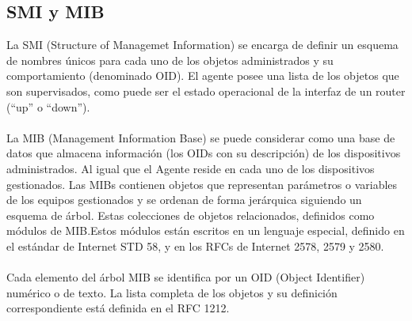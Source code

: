 \documentclass[letterpaper]{article}
\begin{document}
\subsection{SMI y MIB}\label{sub:objgen} %
La SMI (Structure of Managemet Information) se encarga de definir un esquema
de nombres únicos para cada uno de los objetos administrados y su comportamiento
(denominado OID). El agente posee una lista de los objetos que son supervisados, como
puede ser el estado operacional de la interfaz de un router (“up” o “down”).\\\\
La MIB (Management Information Base) se puede considerar como una base de
datos que almacena información (los OIDs con su descripción) de los dispositivos
administrados. Al igual que el Agente reside en cada uno de los dispositivos
gestionados. Las MIBs contienen objetos que representan parámetros o variables de los
equipos gestionados y se ordenan de forma jerárquica siguiendo un esquema de árbol.
Estas colecciones de objetos relacionados, definidos como módulos de MIB.\@ Estos
módulos están escritos en un lenguaje especial, definido en el estándar de Internet STD
58, y en los RFCs de Internet 2578, 2579 y 2580.\\\\
Cada elemento del árbol MIB se identifica por un OID (Object Identifier)
numérico o de texto. La lista completa de los objetos y su definición
correspondiente está definida en el RFC 1212.\\\\
\end{document}
